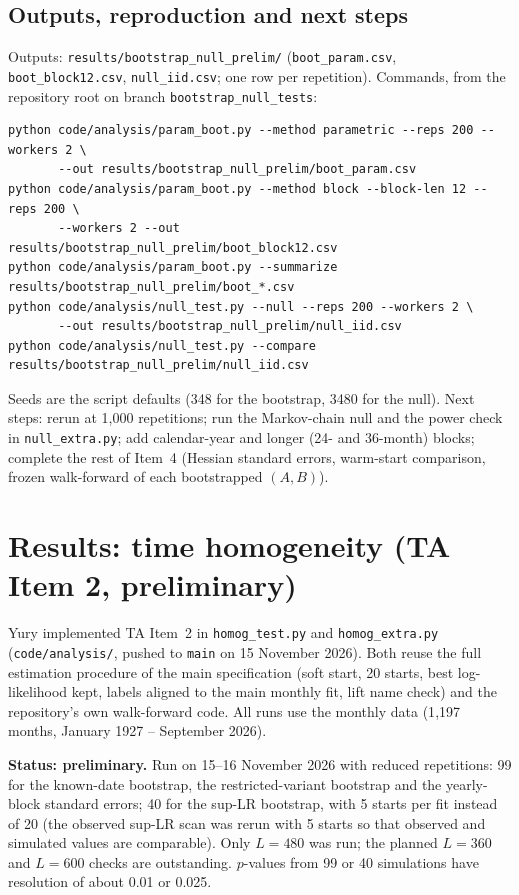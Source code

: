 \documentclass[11pt]{article}
\begin{document}
\subsection{Outputs, reproduction and next steps}
Outputs: \texttt{results/bootstrap\_null\_prelim/} (\texttt{boot\_param.csv}, \texttt{boot\_block12.csv}, \texttt{null\_iid.csv}; one row per repetition). Commands, from the repository root on branch \texttt{bootstrap\_null\_tests}:
{\footnotesize
\begin{verbatim}
python code/analysis/param_boot.py --method parametric --reps 200 --workers 2 \
       --out results/bootstrap_null_prelim/boot_param.csv
python code/analysis/param_boot.py --method block --block-len 12 --reps 200 \
       --workers 2 --out results/bootstrap_null_prelim/boot_block12.csv
python code/analysis/param_boot.py --summarize results/bootstrap_null_prelim/boot_*.csv
python code/analysis/null_test.py --null --reps 200 --workers 2 \
       --out results/bootstrap_null_prelim/null_iid.csv
python code/analysis/null_test.py --compare results/bootstrap_null_prelim/null_iid.csv
\end{verbatim}
}
Seeds are the script defaults (348 for the bootstrap, 3480 for the null). Next steps: rerun at 1{,}000 repetitions; run the Markov-chain null and the power check in \texttt{null\_extra.py}; add calendar-year and longer (24- and 36-month) blocks; complete the rest of Item~4 (Hessian standard errors, warm-start comparison, frozen walk-forward of each bootstrapped $(A,B)$).

\section{Results: time homogeneity (TA Item 2, preliminary)}\label{sec:homog}

Yury implemented TA Item~2 in \texttt{homog\_test.py} and \texttt{homog\_extra.py} (\texttt{code/analysis/}, pushed to \texttt{main} on 15 November 2026). Both reuse the full estimation procedure of the main specification (soft start, 20 starts, best log-likelihood kept, labels aligned to the main monthly fit, lift name check) and the repository's own walk-forward code. All runs use the monthly data (1{,}197 months, January 1927 -- September 2026).

\textbf{Status: preliminary.} Run on 15--16 November 2026 with reduced repetitions: 99 for the known-date bootstrap, the restricted-variant bootstrap and the yearly-block standard errors; 40 for the sup-LR bootstrap, with 5 starts per fit instead of 20 (the observed sup-LR scan was rerun with 5 starts so that observed and simulated values are comparable). Only $L=480$ was run; the planned $L=360$ and $L=600$ checks are outstanding. $p$-values from 99 or 40 simulations have resolution of about 0.01 or 0.025.
\end{document}
